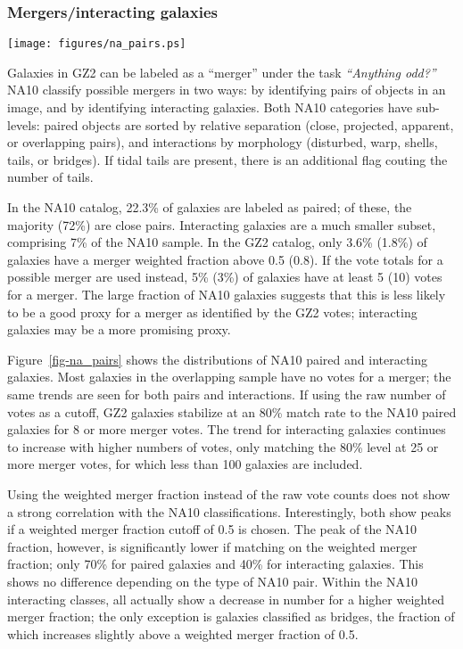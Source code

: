 \documentclass[useAMS,usenatbib]{mn2e}
\begin{document}
\subsubsection{Mergers/interacting galaxies}

\begin{figure*}
\texttt{[image: figures/na\_pairs.ps]}
\caption{NA10 galaxies as a function of the votes/vote fraction for merger in GZ2. This includes all galaxies in the overlap sample (black), galaxies in pairs (blue), and interacting galaxies (red). Data are for the 12,480 galaxies found in both samples.
\label{fig-na_pairs}}
\end{figure*}

Galaxies in GZ2 can be labeled as a ``merger'' under the task {\it ``Anything odd?''} NA10 classify possible mergers in two ways: by identifying pairs of objects in an image, and by identifying interacting galaxies. Both NA10 categories have sub-levels: paired objects are sorted by relative separation (close, projected, apparent, or overlapping pairs), and interactions by morphology (disturbed, warp, shells, tails, or bridges). If tidal tails are present, there is an additional flag couting the number of tails. 

In the NA10 catalog, 22.3\% of galaxies are labeled as paired; of these, the majority (72\%) are close pairs. Interacting galaxies are a much smaller subset, comprising 7\% of the NA10 sample. In the GZ2 catalog, only 3.6\% (1.8\%) of galaxies have a merger weighted fraction above 0.5 (0.8). If the vote totals for a possible merger are used instead, 5\% (3\%) of galaxies have at least 5 (10) votes for a merger. The large fraction of NA10 galaxies suggests that this is less likely to be a good proxy for a merger as identified by the GZ2 votes; interacting galaxies may be a more promising proxy. 

Figure~\ref{fig-na_pairs} shows the distributions of NA10 paired and interacting galaxies. Most galaxies in the overlapping sample have no votes for a merger; the same trends are seen for both pairs and interactions. If using the raw number of votes as a cutoff, GZ2 galaxies stabilize at an 80\% match rate to the NA10 paired galaxies for 8 or more merger votes. The trend for interacting galaxies continues to increase with higher numbers of votes, only matching the 80\% level at 25 or more merger votes, for which less than 100 galaxies are included.

Using the weighted merger fraction instead of the raw vote counts does not show a strong correlation with the NA10 classifications. Interestingly, both show peaks if a weighted merger fraction cutoff of 0.5 is chosen. The peak of the NA10 fraction, however, is significantly lower if matching on the weighted merger fraction; only 70\% for paired galaxies and 40\% for interacting galaxies. This shows no difference depending on the type of NA10 pair. Within the NA10 interacting classes, all actually show a decrease in number for a higher weighted merger fraction; the only exception is galaxies classified as bridges, the fraction of which increases slightly above a weighted merger fraction of 0.5. 
\end{document}
